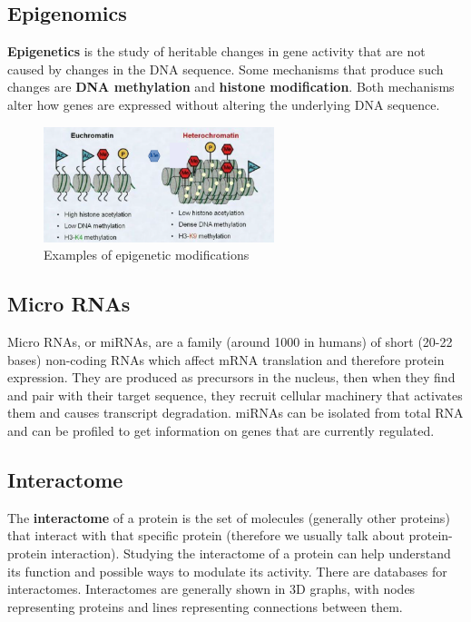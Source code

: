     \subsection{Epigenomics}
      \textbf{Epigenetics} is the study of heritable changes in gene activity that are not caused by changes in the DNA sequence. Some mechanisms that produce such changes are \textbf{DNA methylation} and \textbf{histone modification}. Both mechanisms alter how genes are expressed without altering the underlying DNA sequence.

      \begin{figure}[ht]
      \caption{Examples of epigenetic modifications}
      \centering
      \includegraphics[width=0.6\textwidth]{EuEteroChromatin}
      \end{figure}

    \subsection{Micro RNAs}
      Micro RNAs, or miRNAs, are a family (around 1000 in humans) of short (20-22 bases) non-coding RNAs which affect mRNA translation and therefore protein expression. They are produced as precursors in the nucleus, then when they find and pair with their target sequence, they recruit cellular machinery that activates them and causes transcript degradation. miRNAs can be isolated from total RNA and can be profiled to get information on genes that are currently regulated.

    \subsection{Interactome}
      The \textbf{interactome} of a protein is the set of molecules (generally other proteins) that interact with that specific protein (therefore we usually talk about protein-protein interaction). Studying the interactome of a protein can help understand its function and possible ways to modulate its activity. There are databases for interactomes. Interactomes are generally shown in 3D graphs, with nodes representing proteins and lines representing connections between them.  
